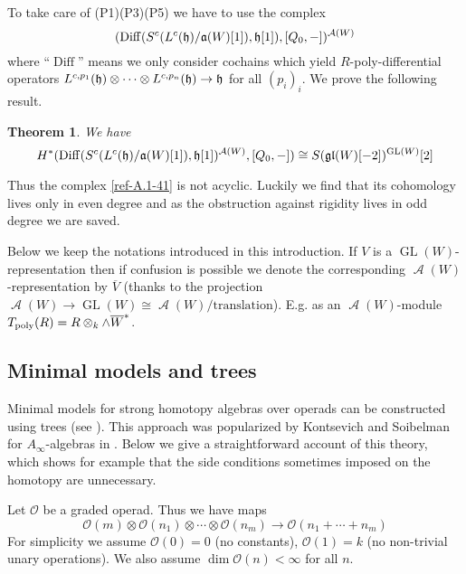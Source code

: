 \documentclass{amsart}
\numberwithin{equation}{section}
\let\cal\mathcal
\newtheorem{theorems}[lemmas]{Theorem}
\theoremstyle{definition}
\theoremstyle{remark}
\begin{document}
To take care of (P1)(P3)(P5) we have to use the complex
\begin{equation}
\label{ref-A.1-41}
 ({\operatorname{Diff}}(S^c(L^c(\frak{h})/{\mathfrak{a}}(W)[1]),\frak{h}[1]),[Q_0,-])^{{\operatorname{{\cal A}}}(W)}
\end{equation}
where ``${\operatorname{Diff}}$'' means we only consider cochains which yield
$R$-poly-differential operators $L^{c,p_1}(\frak{h})\otimes \cdots
\otimes L^{c,p_n}(\frak{h})\rightarrow \frak{h}$ for all $(p_i)_i$.  We prove the following
result.
\begin{theorems} 
\label{ref-A.1.2-42} We have 
\[
H^\ast({\operatorname{Diff}}(S^c(L^c(\frak{h})/{\mathfrak{a}}(W)[1]),\frak{h}[1])^{{\operatorname{{\cal A}}}(W)},[Q_0,-])\cong
S(\frak{gl}(W)[-2])^{{\operatorname {GL}}(W)}[2]
\]
\end{theorems}
Thus the complex \eqref{ref-A.1-41} is not acyclic. Luckily
we find that its cohomology lives only in even degree and as the
obstruction against rigidity lives in odd degree we are saved.

\medskip

Below we keep the notations introduced in this introduction. If $V$ is
a ${\operatorname {GL}}(W)$-representation then if confusion is possible we denote the
corresponding ${\operatorname{{\cal A}}}(W)$-representation by $\overline{V}$ (thanks to the 
projection ${\operatorname{{\cal A}}}(W)\to {\operatorname {GL}}(W)\cong{\operatorname{{\cal A}}}(W)/\textrm{translation}$). E.g. as an 
${\operatorname{{\cal A}}}(W)$-module $T_{\rm poly}(R)=R\otimes_k\wedge\overline{W}^*$. 

\subsection{Minimal models and trees}
\label{ref-A.2-43}

Minimal models for strong homotopy algebras over operads can be
constructed using trees (see \cite{CL,KS2,Merkulov}). This approach
was popularized by Kontsevich and Soibelman for $A_\infty$-algebras in
\cite{KS2}. Below we give a straightforward account of this theory,
which shows for example that the side conditions sometimes imposed
on the homotopy are unnecessary.

Let ${{\cal O}}$ be a graded operad.  Thus we have maps
\begin{equation}
\label{ref-A.2-44}
{{\cal O}}(m)\otimes {{\cal O}}(n_1)\otimes \cdots \otimes {{\cal O}}(n_m){\rightarrow}
{{\cal O}}(n_1+\cdots +n_m)
\end{equation}
For simplicity we assume ${{\cal O}}(0)=0$ (no
constants), ${{\cal O}}(1)=k$ (no non-trivial unary operations). We also
assume $\dim {{\cal O}}(n)<\infty$ for all $n$. 
\end{document}
